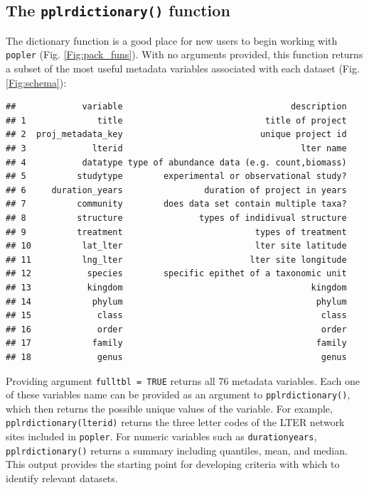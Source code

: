 \documentclass{article}\usepackage[]{graphicx}\usepackage[]{color}
\makeatletter
\newenvironment{kframe}{%
 \def\at@end@of@kframe{}%
 \ifinner\ifhmode%
  \def\at@end@of@kframe{\end{minipage}}%
  \begin{minipage}{\columnwidth}%
 \fi\fi%
 \def\FrameCommand##1{\hskip\@totalleftmargin \hskip-\fboxsep
 \colorbox{shadecolor}{##1}\hskip-\fboxsep
     \hskip-\linewidth \hskip-\@totalleftmargin \hskip\columnwidth}%
 \MakeFramed {\advance\hsize-\width
   \@totalleftmargin\z@ \linewidth\hsize
   \@setminipage}}%
 {\par\unskip\endMakeFramed%
 \at@end@of@kframe}
\newenvironment{knitrout}{}{} %
\makeatother
\begin{document}
\subsection*{The \texttt{pplr\textunderscore dictionary()} function}
The dictionary function is a good place for new users to begin working with \texttt{popler} (Fig. \ref{Fig:pack_funs}). With no arguments provided, this function returns a subset of the most useful metadata variables associated with each  dataset (Fig. \ref{Fig:schema}):
\begin{knitrout}
\color{fgcolor}\begin{kframe}
\begin{verbatim}
##             variable                                 description
## 1              title                            title of project
## 2  proj_metadata_key                           unique project id
## 3             lterid                                   lter name
## 4           datatype type of abundance data (e.g. count,biomass)
## 5          studytype        experimental or observational study?
## 6     duration_years                duration of project in years
## 7          community        does data set contain multiple taxa?
## 8          structure               types of indidivual structure
## 9          treatment                          types of treatment
## 10          lat_lter                          lter site latitude
## 11          lng_lter                         lter site longitude
## 12           species        specific epithet of a taxonomic unit
## 13           kingdom                                     kingdom
## 14            phylum                                      phylum
## 15             class                                       class
## 16             order                                       order
## 17            family                                      family
## 18             genus                                       genus
\end{verbatim}
\end{kframe}
\end{knitrout}
Providing argument \texttt{full\textunderscore tbl = TRUE} returns all 76 metadata variables. Each one of these variables name can be provided as an argument to \texttt{pplr\textunderscore dictionary()}, which then returns the possible unique values of the variable. For example, \texttt{pplr\textunderscore dictionary(lterid)} returns the three letter codes of the LTER network sites included in \texttt{popler}. For numeric variables such as \texttt{duration\textunderscore years}, \texttt{pplr\textunderscore dictionary()} returns a summary including quantiles, mean, and median. This output provides the starting point for developing criteria with which to identify relevant datasets.
\end{document}
